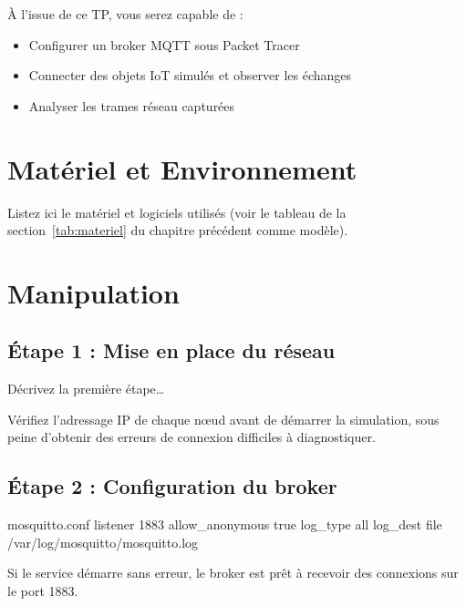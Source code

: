 \documentclass[12pt,a4paper]{report}
\begin{document}
À l'issue de ce TP, vous serez capable de :

\begin{itemize}
    \item Configurer un broker MQTT sous Packet Tracer
    \item Connecter des objets IoT simulés et observer les échanges
    \item Analyser les trames réseau capturées
\end{itemize}

\section{Matériel et Environnement}

Listez ici le matériel et logiciels utilisés (voir le tableau de la section~\ref{tab:materiel}
du chapitre précédent comme modèle).

\section{Manipulation}

\subsection{Étape 1 : Mise en place du réseau}

Décrivez la première étape\ldots

\begin{cardwarning}
    Vérifiez l'adressage IP de chaque nœud avant de démarrer la simulation, sous peine 
    d'obtenir des erreurs de connexion difficiles à diagnostiquer.
\end{cardwarning}

\subsection{Étape 2 : Configuration du broker}

\begin{codeblock}{mosquitto.conf}
listener 1883
allow_anonymous true
log_type all
log_dest file /var/log/mosquitto/mosquitto.log
\end{codeblock}

\begin{cardsuccess}
    Si le service démarre sans erreur, le broker est prêt à recevoir des connexions
    sur le port 1883.
\end{cardsuccess}
\end{document}
